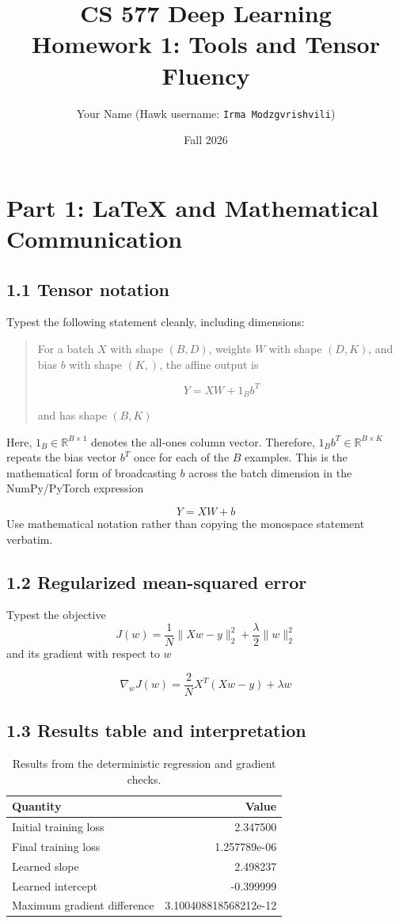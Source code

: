 \documentclass[11pt]{article}
\title{CS 577 Deep Learning\\Homework 1: Tools and Tensor Fluency}
\author{Your Name (Hawk username: \texttt{Irma Modzgvrishvili})}
\date{Fall 2026}
\begin{document}
\maketitle

\section*{Part 1: LaTeX and Mathematical Communication}

\subsection*{1.1 Tensor notation}

Typest the following statement cleanly, including dimensions:
\begin{quote}
For a batch $X$ with shape $(B,D)$, weights $W$ with shape $(D,K)$,
and bias $b$ with shape $(K,)$, the affine output is

\[
Y = XW + 1_Bb^T
\]

and has shape $(B,K)$
\end{quote}
\noindent
Here, $1_B \in \mathbb{R}^{B \times 1}$ denotes the all-ones column vector. Therefore, $1_Bb^T \in \mathbb{R}^{B \times K}$ repeats the bias vector $b^T$ once for each of the $B$ examples. This is the mathematical form of broadcasting $b$ across the batch dimension in the NumPy/PyTorch expression 

\[
Y = XW + b
\]
\noindent
Use mathematical notation rather than copying the monospace statement verbatim.

\subsection*{1.2 Regularized mean-squared error}
Typest the objective
\[
J(w)=\frac{1}{N}\|Xw-y\|_2^2+\frac{\lambda}{2}\|w\|_2^2
\]
\noindent
and its gradient with respect to $w$

\[
  \nabla_w J(w) = \frac{2}{N} X^T (Xw - y) + \lambda w
\]
\subsection*{1.3 Results table and interpretation}
\begin{table}[H]
  \centering
  \begin{tabular}{lr}
    \toprule
    Quantity & Value \\
    \midrule
    Initial training loss & 2.347500 \\
    Final training loss & 1.257789e-06 \\
    Learned slope & 2.498237 \\
    Learned intercept & -0.399999 \\
    Maximum gradient difference & 3.100408818568212e-12 \\
    \bottomrule
  \end{tabular}
  \caption{Results from the deterministic regression and gradient checks.}
\end{table}
\end{document}
